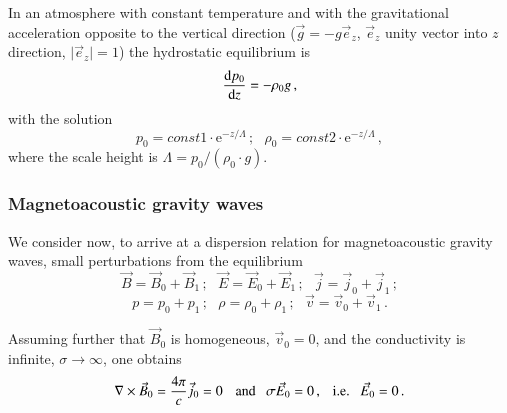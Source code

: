 In an atmosphere with constant temperature and with the gravitational acceleration opposite to the vertical direction ($\vec g=-g\vec e_z$, $\vec e_z$ unity vector into $z$ direction, $\vert\vec e_z\vert=1$) the hydrostatic equilibrium is 
\begin{equation}
{\mathrm{d}p_0\over\mathrm{d}z} = -\rho_0 g\,,
\label{mhd11}
\end{equation}
with the solution
\begin{equation}
p_0 = const1\cdot\mathrm{e}^{-z/\Lambda}\,;~~~\rho_0 = const2\cdot\mathrm{e}^{-z/\Lambda}\,,
\label{mhd12}
\end{equation}
where the scale height is $\Lambda=p_0/(\rho_0\cdot g)$.


\subsubsection*{Magnetoacoustic gravity waves\label{mhdwaves}}

We consider now, to arrive at a dispersion relation for magnetoacoustic gravity waves, small perturbations from the equilibrium
%
\begin{equation}
\vec B = \vec B_0 + \vec B_1\,;~~~\vec E = \vec E_0 + \vec E_1\,;~~~\vec j = \vec j_0 + \vec j_1\,;
\label{mhd13}
\end{equation}
\begin{equation}
p = p_0 + p_1\,;~~~\rho = \rho_0 + \rho_1\,;~~~\vec v = \vec v_0 + \vec v_1\,.
\nonumber
\label{mhd14}
\end{equation}

Assuming further that $\vec B_0$ is homogeneous, $\vec v_0=0$, and the conductivity is infinite, $\sigma\rightarrow\infty$, one obtains 
\begin{equation}
\nabla\times\vec B_0 = {4\pi\over c}\vec j_0=0\,~~~\mathrm{and}~~~\sigma\vec E_0=0\,,~~~\mathrm{i.e.}~~~\vec E_0 = 0\,.
\label{mhd16}
\end{equation}
%

